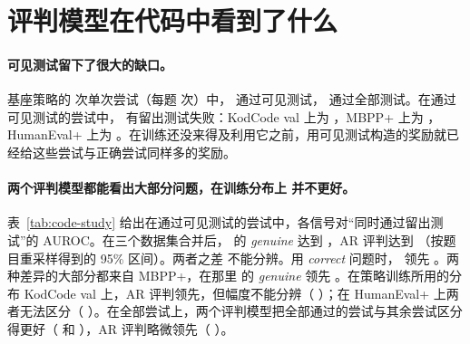 
\section{评判模型在代码中看到了什么}\label{sec:res-study}

\paragraph{可见测试留下了很大的缺口。} 基座策略的  次单次尝试（每题  次）中， 通过可见测试， 通过全部测试。在通过可见测试的尝试中， 有留出测试失败：KodCode val 上为 ，MBPP+ 上为 ，HumanEval+ 上为 。在训练还没来得及利用它之前，用可见测试构造的奖励就已经给这些尝试与正确尝试同样多的奖励。

\paragraph{两个评判模型都能看出大部分问题，在训练分布上 \kev{} 并不更好。} 表~\ref{tab:code-study} 给出在通过可见测试的尝试中，各信号对“同时通过留出测试”的 AUROC。在三个数据集合并后，\kev{} 的 \emph{genuine} 达到  ，AR 评判达到  （按题目重采样得到的 95\% 区间）。两者之差   不能分辨。用 \emph{correct} 问题时，\kev{} 领先  。两种差异的大部分都来自 MBPP+，在那里 \kev{} 的 \emph{genuine} 领先  。在策略训练所用的分布 KodCode val 上，AR 评判领先，但幅度不能分辨（ ）；在 HumanEval+ 上两者无法区分（ ）。在全部尝试上，两个评判模型把全部通过的尝试与其余尝试区分得更好（ 和 ），AR 评判略微领先（ ）。

\begin{table}[t]
\centering\small

\caption{在基座策略通过可见测试的尝试中（每题  次尝试，温度 1），各评判信号对“通过留出测试”的 AUROC。\emph{within}：在  道“通过可见测试的尝试中既有通过也有未通过留出测试者”的题目内部的平均 AUROC。\emph{all pass}：在全部尝试上识别“通过全部测试”的 AUROC。95\% 区间由按题目重采样得到。}
\label{tab:code-study}
\end{table}

